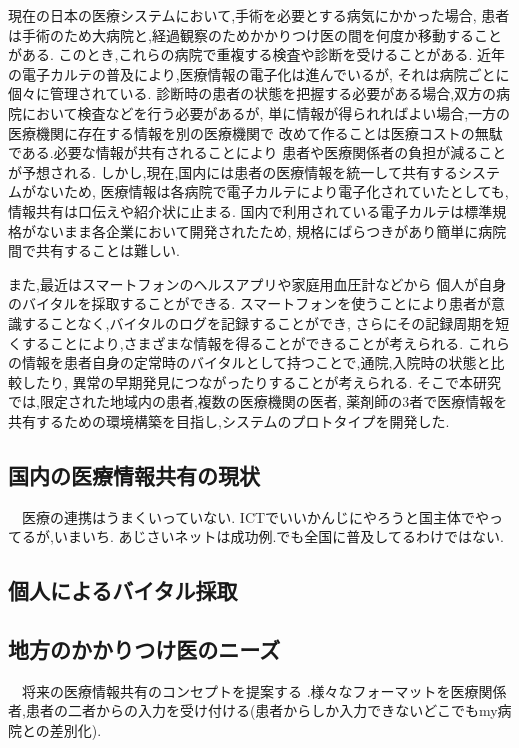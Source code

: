 現在の日本の医療システムにおいて,手術を必要とする病気にかかった場合,
患者は手術のため大病院と,経過観察のためかかりつけ医の間を何度か移動することがある.
このとき,これらの病院で重複する検査や診断を受けることがある.
近年の電子カルテの普及により,医療情報の電子化は進んでいるが,
それは病院ごとに個々に管理されている.
診断時の患者の状態を把握する必要がある場合,双方の病院において検査などを行う必要があるが,
単に情報が得られればよい場合,一方の医療機関に存在する情報を別の医療機関で
改めて作ることは医療コストの無駄である.必要な情報が共有されることにより
患者や医療関係者の負担が減ることが予想される.
しかし,現在,国内には患者の医療情報を統一して共有するシステムがないため,
医療情報は各病院で電子カルテにより電子化されていたとしても,
情報共有は口伝えや紹介状に止まる.
国内で利用されている電子カルテは標準規格がないまま各企業において開発されたため,
規格にばらつきがあり簡単に病院間で共有することは難しい.

また,最近はスマートフォンのヘルスアプリや家庭用血圧計などから
個人が自身のバイタルを採取することができる.
スマートフォンを使うことにより患者が意識することなく,バイタルのログを記録することができ,
さらにその記録周期を短くすることにより,さまざまな情報を得ることができることが考えられる.
これらの情報を患者自身の定常時のバイタルとして持つことで,通院,入院時の状態と比較したり,
異常の早期発見につながったりすることが考えられる.
そこで本研究では,限定された地域内の患者,複数の医療機関の医者,
薬剤師の3者で医療情報を共有するための環境構築を目指し,システムのプロトタイプを開発した.



\subsection{国内の医療情報共有の現状}
　医療の連携はうまくいっていない.
  ICTでいいかんじにやろうと国主体でやってるが,いまいち.
  あじさいネットは成功例.でも全国に普及してるわけではない.\cite{bibi3}

\subsection{個人によるバイタル採取}

\subsection{地方のかかりつけ医のニーズ}
　将来の医療情報共有のコンセプトを提案する .様々なフォーマットを医療関係者,患者の二者からの入力を受け付ける(患者からしか入力できないどこでもmy病院との差別化).
